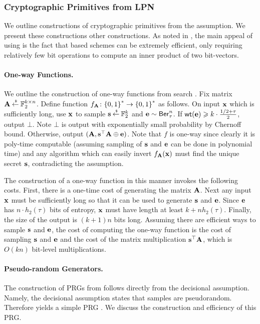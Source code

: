 \subsubsection{Cryptographic Primitives from LPN}
We outline constructions of cryptographic primitives from the \LPN assumption.
We present these constructions \visavis other constructions.
As noted in \cite{TCC:Pietrzak12}, the main appeal of using \LPN is the fact that \LPN based schemes can be extremely efficient, only requiring relatively few bit operations to compute an inner product of two bit-vectors.

\paragraph{One-way Functions.} We outline the construction of one-way functions from search \LPN.
Fix matrix ${\mathbf A}\mathbin{\stackrel{\mbox{\,\tiny \$}}{\gets}} {\mathbb F}_2^{k\times n}$.
Define function $f_{\mathbf A} \colon {\{0,1\}}^* \rightarrow {\{0,1\}}^*$ as follows.
On input ${\mathbf x}$ which is sufficiently long, use ${\mathbf x}$ to sample ${\mathbf s} \mathbin{\stackrel{\mbox{\,\tiny \$}}{\gets}} {\mathbb F}_2^k$ and ${\mathbf e} \sim \mathsf{Ber}_\tau^n$.
If $\mathsf{wt}({\mathbf e})\geqslant k\cdot \frac{1/2+\tau}{2}$, output $\bot$.
Note $\bot$ is output with exponentially small probability by Chernoff bound.
Otherwise, output $({\mathbf A}, {\mathbf s}^\top{\mathbf A}\oplus{\mathbf e})$.
Note that $f$ is one-way since clearly it is poly-time computable (assuming sampling of ${\mathbf s}$ and ${\mathbf e}$ can be done in polynomial time) and any algorithm which can easily invert $f_{\mathbf A}({\mathbf x})$ must find the unique secret ${\mathbf s}$, contradicting the \LPN assumption.

The construction of a one-way function in this manner invokes the following costs.
First, there is a one-time cost of generating the matrix ${\mathbf A}$.
Next any input ${\mathbf x}$ must be sufficiently long so that it can be used to generate ${\mathbf s}$ and ${\mathbf e}$.
Since ${\mathbf e}$ has $n\cdot h_2(\tau)$ bits of entropy, ${\mathbf x}$ must have length at least $k + nh_2(\tau)$.
Finally, the size of the output is $(k+1)n$ bits long.
Assuming there are efficient ways to sample ${\mathbf s}$ and ${\mathbf e}$, the cost of computing the one-way function is the cost of sampling ${\mathbf s}$ and ${\mathbf e}$ and the cost of the matrix multiplication ${\mathbf s}^\top{\mathbf A}$, which is $O(kn)$ bit-level multiplications.



\paragraph{Pseudo-random Generators.} The construction of PRGs from \LPN follows directly from the decisional \LPN assumption.
Namely, the decisional \LPN assumption states that \LPN samples are pseudorandom.
Therefore \LPN yields a simple PRG \cite{C:BFKL93}.
We discuss the construction and efficiency of this PRG.

